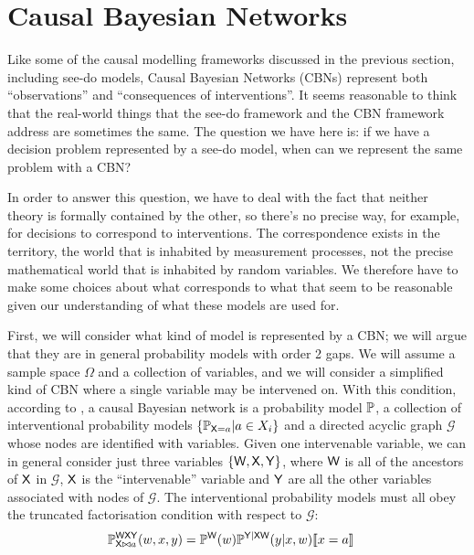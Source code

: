 

\section{Causal Bayesian Networks}\label{sec:CBN}

Like some of the causal modelling frameworks discussed in the previous section, including see-do models, Causal Bayesian Networks (CBNs) represent both ``observations'' and ``consequences of interventions''. It seems reasonable to think that the real-world things that the see-do framework and the CBN framework address are sometimes the same. The question we have here is: if we have a decision problem represented by a see-do model, when can we represent the same problem with a CBN?

In order to answer this question, we have to deal with the fact that neither theory is formally contained by the other, so there's no precise way, for example, for decisions to correspond to interventions. The correspondence exists in the territory, the world that is inhabited by measurement processes, not the precise mathematical world that is inhabited by random variables. We therefore have to make some choices about what corresponds to what that seem to be reasonable given our understanding of what these models are used for.

First, we will consider what kind of model is represented by a CBN; we will argue that they are in general probability models with order 2 gaps. We will assume a sample space $\Omega$ and a collection of variables, and we will consider a simplified kind of CBN where a single variable may be intervened on. With this condition, according to \citet{pearl_causality:_2009}, a causal Bayesian network is a probability model $\mathbb{P}$, a collection of interventional probability models $\{\mathbb{P}_{\mathsf{X}=a}|a\in X_i\}$ and a directed acyclic graph $\mathcal{G}$ whose nodes are identified with variables. Given one intervenable variable, we can in general consider just three variables $\{\mathsf{W},\mathsf{X},\mathsf{Y}\}$, where $\mathsf{W}$ is all of the ancestors of $\mathsf{X}$ in $\mathcal{G}$, $\mathsf{X}$ is the ``intervenable'' variable and $\mathsf{Y}$ are all the other variables associated with nodes of $\mathcal{G}$. The interventional probability models must all obey the truncated factorisation condition with respect to $\mathcal{G}$:
\begin{align}
    \mathbb{P}_{\mathsf{X}\bowtie a}^{\mathsf{W}\mathsf{X}\mathsf{Y}}(w,x,y) &= \mathbb{P}^{\mathsf{W}}(w)\mathbb{P}^{\mathsf{Y}|\mathsf{XW}}(y|x,w)\llbracket x=a \rrbracket\label{eq:truncated_fac2}
\end{align}

